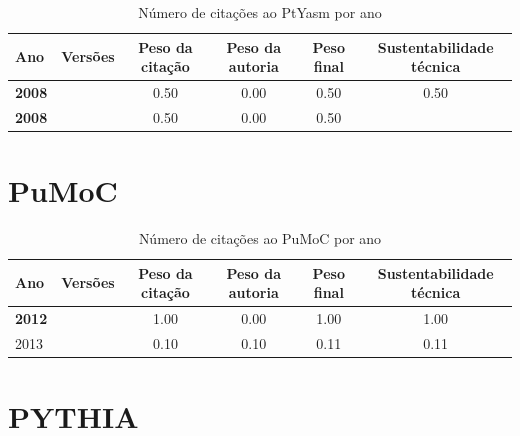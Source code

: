 \begin{table}[H]
\caption{Número de citações ao PtYasm por ano}
\centering
\begin{tabular}{| l | c | c | c | c | c |}
  \hline
  Ano & Versões & Peso da citação & Peso da autoria & Peso final & Sustentabilidade técnica \\
  \hline
            {\bf 2008}
          &
          
          &
          0.50
          &
          0.00
          &
          0.50
          &
            {\color{blue} 0.50}
          \\
            {\bf 2008}
          &
          
          &
          0.50
          &
          0.00
          &
          0.50
          &
          \\
\hline
\end{tabular}
\end{table}



\section{PuMoC}


\begin{table}[H]
\caption{Número de citações ao PuMoC por ano}
\centering
\begin{tabular}{| l | c | c | c | c | c |}
  \hline
  Ano & Versões & Peso da citação & Peso da autoria & Peso final & Sustentabilidade técnica \\
  \hline
            {\bf 2012}
          &
          
          &
          1.00
          &
          0.00
          &
          1.00
          &
            {\color{blue} 1.00}
          \\
\hline
            2013
          &
          
          &
          0.10
          &
          0.10
          &
          0.11
          &
            {\color{red} 0.11}
          \\
\hline
\end{tabular}
\end{table}



\section{PYTHIA}


